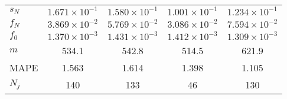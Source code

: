 \begin{table}[!htbp]
\begin{tabular}{lcccc}
\textbf{$s_N$} & $1.671\times10^{-1}$ & $1.580\times10^{-1}$ & $1.001\times10^{-1}$ & $1.234\times10^{-1}$ \\
\textbf{$f_N$} & $3.869\times10^{-2}$ & $5.769\times10^{-2}$ & $3.086\times10^{-2}$ & $7.594\times10^{-2}$ \\
\textbf{$f_0$} & $1.370\times10^{-3}$ & $1.431\times10^{-3}$ & $1.412\times10^{-3}$ & $1.309\times10^{-3}$ \\
\textbf{$m$}   & 534.1 & 542.8 & 514.5 & 621.9 \\
{MAPE}         & 1.563 & 1.614 & 1.398 & 1.105 \\
{$N_j$} & 140 & 133 & 46 & 130 \\
\bottomrule
\end{tabular}
\end{table}
